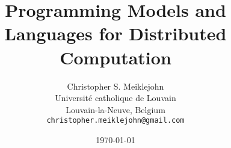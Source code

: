 \documentclass[11pt,twoside,a4paper]{article}
\theoremstyle{definition}
\theoremstyle{definition}
\theoremstyle{remark}
\begin{document}
\title{Programming Models and Languages for Distributed Computation}

\author{Christopher S. Meiklejohn\\
  Universit\'e catholique de Louvain\\
  Louvain-la-Neuve, Belgium\\
  \texttt{christopher.meiklejohn@gmail.com}}
  
\date{\today}
\maketitle

\tableofcontents

\clearpage






\end{document}

